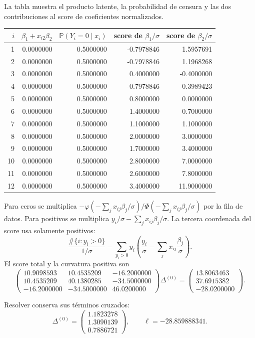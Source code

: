 \documentclass[11pt,a4paper]{article}
\newcommand{\Prob}{\mathbb P}
\begin{document}
La tabla muestra el producto latente,
la probabilidad de censura y
las dos contribuciones al score
de coeficientes normalizados.
\begin{center}\small\begin{tabular}{rrrrr}\toprule
\(i\)&\(\beta_1+x_{i2}\beta_2\)&\(\Prob(Y_i=0\mid x_i)\)&score de \(\beta_1/\sigma\)&score de \(\beta_2/\sigma\)\\\midrule
1&0.0000000&0.5000000&-0.7978846&1.5957691\\
2&0.0000000&0.5000000&-0.7978846&1.1968268\\
3&0.0000000&0.5000000&0.4000000&-0.4000000\\
4&0.0000000&0.5000000&-0.7978846&0.3989423\\
5&0.0000000&0.5000000&0.8000000&0.0000000\\
6&0.0000000&0.5000000&1.4000000&0.7000000\\
7&0.0000000&0.5000000&1.1000000&1.1000000\\
8&0.0000000&0.5000000&2.0000000&3.0000000\\
9&0.0000000&0.5000000&1.7000000&3.4000000\\
10&0.0000000&0.5000000&2.8000000&7.0000000\\
11&0.0000000&0.5000000&2.6000000&7.8000000\\
12&0.0000000&0.5000000&3.4000000&11.9000000\\\bottomrule\end{tabular}\end{center}
Para ceros se multiplica
\(-\varphi(-\sum_jx_{ij}\beta_j/\sigma)/
\Phi(-\sum_jx_{ij}\beta_j/\sigma)\)
por la fila de datos.
Para positivos se multiplica
\(y_i/\sigma-\sum_jx_{ij}\beta_j/\sigma\).
La tercera coordenada del score
usa solamente positivos:
\[
\frac{\#\{i:y_i>0\}}{1/\sigma}
-\sum_{y_i>0}y_i\left(\frac{y_i}{\sigma}
-\sum_jx_{ij}\frac{\beta_j}{\sigma}\right).
\]
El score total y la curvatura positiva son
\[
\begin{pmatrix}10.9098593&10.4535209&-16.2000000\\10.4535209&40.1380285&-34.5000000\\-16.2000000&-34.5000000&46.0200000\end{pmatrix}\Delta^{(0)}=\begin{pmatrix}13.8063463\\37.6915382\\-28.0200000\end{pmatrix}.
\]

Resolver conserva sus términos cruzados:
\[
\Delta^{(0)}=\begin{pmatrix}1.1823278\\1.3090139\\0.7886721\end{pmatrix},\qquad\ell=-28.859888341.
\]
\end{document}

